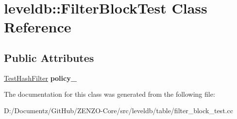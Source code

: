 \hypertarget{classleveldb_1_1_filter_block_test}{}\section{leveldb\+::Filter\+Block\+Test Class Reference}
\label{classleveldb_1_1_filter_block_test}
\subsection*{Public Attributes}
\begin{DoxyCompactItemize}
\item 
\mbox{\label{classleveldb_1_1_filter_block_test_ae52fe0fab92f8efc0c078b117cf43e67}} 
\mbox{\hyperlink{classleveldb_1_1_test_hash_filter}{Test\+Hash\+Filter}} {\bfseries policy\+\_\+}
\end{DoxyCompactItemize}


The documentation for this class was generated from the following file\+:\begin{DoxyCompactItemize}
\item 
D\+:/\+Documentz/\+Git\+Hub/\+Z\+E\+N\+Z\+O-\/\+Core/src/leveldb/table/filter\+\_\+block\+\_\+test.\+cc\end{DoxyCompactItemize}
